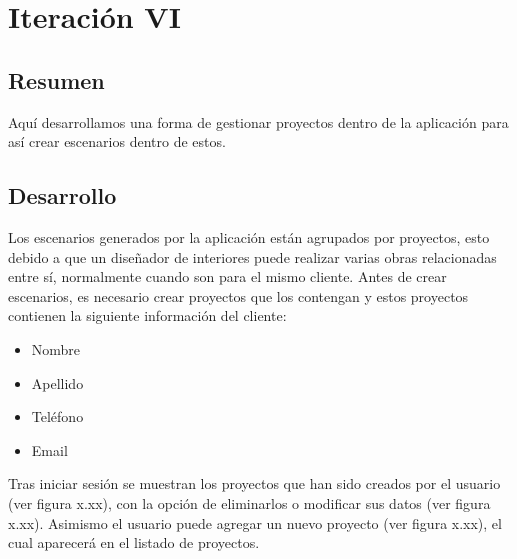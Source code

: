 \section{Iteración VI}
\subsection{Resumen}
Aquí desarrollamos una forma de gestionar proyectos dentro de la aplicación para así crear escenarios dentro de estos.

\subsection{Desarrollo}
Los escenarios generados por la aplicación están agrupados por proyectos, esto debido a que un diseñador de interiores puede realizar varias obras relacionadas entre sí, normalmente cuando son para el mismo cliente. Antes de crear escenarios, es necesario crear proyectos que los contengan y estos proyectos contienen la siguiente información del cliente:
\begin{itemize}
	\item Nombre
	\item Apellido
	\item Teléfono
	\item Email
\end{itemize}

Tras iniciar sesión se muestran los proyectos que han sido creados por el usuario (ver figura x.xx), con la opción de eliminarlos o modificar sus datos (ver figura x.xx). Asimismo el usuario puede agregar un nuevo proyecto (ver figura x.xx), el cual aparecerá en el listado de proyectos.


